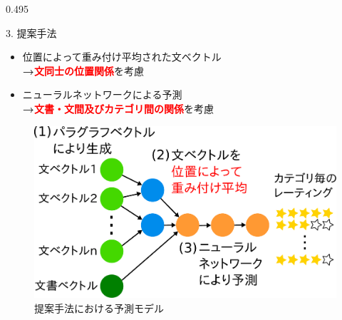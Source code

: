 \documentclass[unicode,10pt]{beamer}
\newcommand{\mycolumnwidth}{0.495\textwidth}
\newcommand{\arrow}{\textcolor{ttiblue}{\textbf{→}}\hspace{1ex}}
\newcommand{\itemtitle}[1]{\textbf{#1}\\}
\newcommand{\fire}[1]{\textcolor{red}{\textbf{#1}}}
\begin{document}
\begin{frame}
\begin{columns}[onlytextwidth,t]
\begin{column}{\mycolumnwidth}
  \begin{block}{3. 提案手法}
        \begin{itemize}
          \item 位置によって重み付け平均された文ベクトル \\
                \arrow \fire{文同士の位置関係}を考慮
          \item ニューラルネットワークによる予測 \\
                \arrow \fire{文書・文間及びカテゴリ間の関係}を考慮
        \end{itemize}
    \begin{figure}
      \includegraphics[width=0.9\linewidth]
                      {fig/model_with_detailed_processes.pdf}
      \caption*{提案手法における予測モデル}
    \end{figure}
  \end{block}
\end{column}


\end{columns}
\end{frame}
\end{document}
